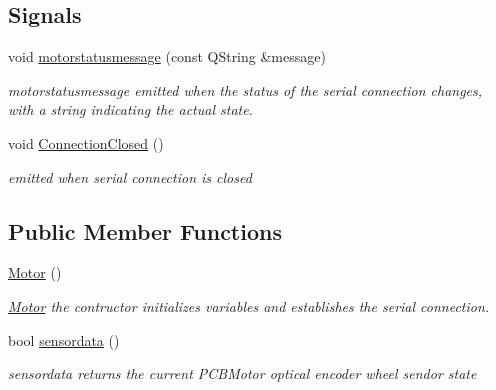 \subsection*{Signals}
\begin{DoxyCompactItemize}
\item 
void \hyperlink{classMotor_ad12a639c95a4a33f59118dc8145dc1d4}{motorstatusmessage} (const Q\+String \&message)
\begin{DoxyCompactList}\small\item\em motorstatusmessage emitted when the status of the serial connection changes, with a string indicating the actual state. \end{DoxyCompactList}\item 
\mbox{\label{classMotor_afcf83aa74380932f2408c150b806b5fb}} 
void \hyperlink{classMotor_afcf83aa74380932f2408c150b806b5fb}{Connection\+Closed} ()
\begin{DoxyCompactList}\small\item\em emitted when serial connection is closed \end{DoxyCompactList}\end{DoxyCompactItemize}
\subsection*{Public Member Functions}
\begin{DoxyCompactItemize}
\item 
\mbox{\label{classMotor_af6fb1d675035fd353cd2cb97dbdbecc9}} 
\hyperlink{classMotor_af6fb1d675035fd353cd2cb97dbdbecc9}{Motor} ()
\begin{DoxyCompactList}\small\item\em \hyperlink{classMotor}{Motor} the contructor initializes variables and establishes the serial connection. \end{DoxyCompactList}\item 
bool \hyperlink{classMotor_a3e5e0ed8b8095588a09283200aaeb142}{sensordata} ()
\begin{DoxyCompactList}\small\item\em sensordata returns the current P\+C\+B\+Motor optical encoder wheel sendor state \end{DoxyCompactList}\end{DoxyCompactItemize}
